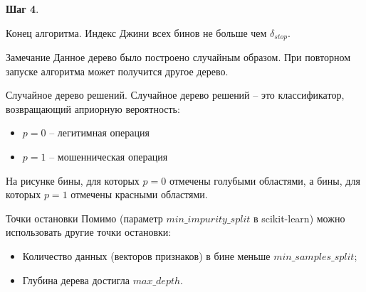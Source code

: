 \begin{frame}
	\small
	\textbf{Шаг 4}.
	\begin{center}
	\begin{tikzpicture}[scale=1.5]
	
	\end{tikzpicture}
	\end{center}
	Конец алгоритма. Индекс Джини всех бинов не больше чем $\delta_{stop}$.
	\begin{block}{Замечание}
	Данное дерево было построено случайным образом. 
	При повторном запуске алгоритма может получится другое дерево.
	\end{block}
\end{frame}

\begin{frame}{Случайное дерево решений.}
	\small
	Случайное дерево решений -- это 
	 классификатор,
	возвращающий априорную вероятность:
	\begin{itemize}
	\item $p=0$ -- легитимная операция
	\item $p=1$ -- мошенническая операция
	\end{itemize}

	\begin{figure}
	\vspace{-25pt}
	\begin{tikzpicture}[scale=1.5]
	
	\end{tikzpicture}
	\end{figure}
	
	На рисунке бины, для которых $p=0$ отмечены голубыми областями,
	а бины, для которых $p=1$ отмечены красными областями.
	
\end{frame}

\begin{frame}{Точки остановки}
	Помимо  (параметр $min\_impurity\_split$ в scikit-learn)
	можно использовать другие точки остановки:
	\begin{itemize}
	\item Количество данных (векторов признаков)
	в бине меньше $min\_samples\_split$;
	\item Глубина дерева достигла $max\_depth$.
	\end{itemize}
	
\end{frame}

